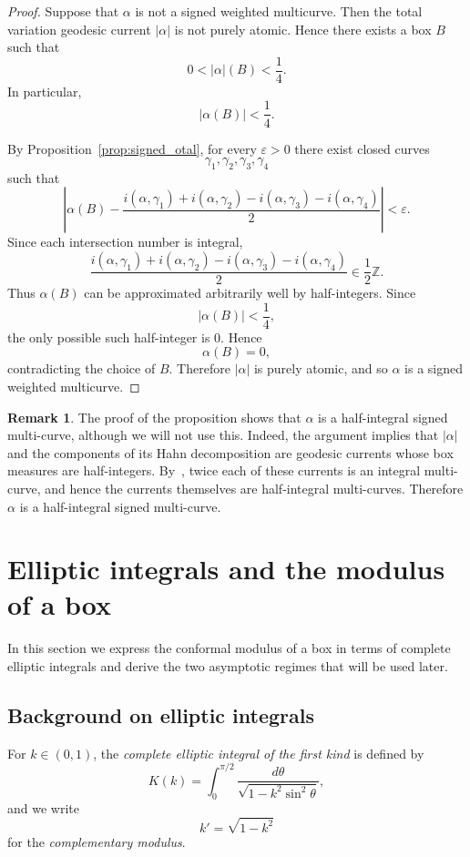 \documentclass[12pt]{amsart}
\numberwithin{equation}{section}
\numberwithin{figure}{section}
\theoremstyle{definition}
\newtheorem{remark}[equation]{Remark}
\theoremstyle{plain}
\begin{document}
\begin{proof}
Suppose that $\alpha$ is not a signed weighted multicurve.
Then the total variation geodesic current $|\alpha|$ is not purely atomic.
Hence there exists a box $B$ such that
\[
0<|\alpha|(B)<\frac14.
\]
In particular,
\[
|\alpha(B)|<\frac14.
\]

By Proposition~\ref{prop:signed_otal}, for every $\varepsilon>0$ there exist closed curves
\[
\gamma_1,\gamma_2,\gamma_3,\gamma_4
\]
such that
\[
\left|
\alpha(B)
-
\frac{
i(\alpha,\gamma_1)
+i(\alpha,\gamma_2)
-i(\alpha,\gamma_3)
-i(\alpha,\gamma_4)
}{2}
\right|
<\varepsilon.
\]
Since each intersection number is integral,
\[
\frac{
i(\alpha,\gamma_1)
+i(\alpha,\gamma_2)
-i(\alpha,\gamma_3)
-i(\alpha,\gamma_4)
}{2}
\in \frac12\mathbb Z.
\]
Thus $\alpha(B)$ can be approximated arbitrarily well by half-integers.
Since
\[
|\alpha(B)|<\frac14,
\]
the only possible such half-integer is $0$.
Hence
\[
\alpha(B)=0,
\]
contradicting the choice of $B$.
Therefore $|\alpha|$ is purely atomic, and so $\alpha$ is a signed weighted multicurve.
\end{proof}

\begin{remark}
The proof of the proposition shows that $\alpha$ is a half-integral signed multi-curve, although we will not use this. Indeed, the argument implies that $|\alpha|$ and the components of its Hahn decomposition are geodesic currents whose box measures are half-integers. By~\cite[Proposition~4.12]{BIPP21:Crossratios}, twice each of these currents is an integral multi-curve, and hence the currents themselves are half-integral multi-curves. Therefore $\alpha$ is a half-integral signed multi-curve.
\end{remark}
\section{Elliptic integrals and the modulus of a box}
\label{sec:elliptic-modulus}

In this section we express the conformal modulus of a box in terms of complete elliptic integrals and derive the two asymptotic regimes that will be used later.

\subsection{Background on elliptic integrals}

For $k\in(0,1)$, the \emph{complete elliptic integral of the first kind} is defined by
\[
K(k)=\int_0^{\pi/2}\frac{d\theta}{\sqrt{1-k^2\sin^2\theta}},
\]
and we write
\[
k'=\sqrt{1-k^2}
\]
for the \emph{complementary modulus}.
\end{document}
